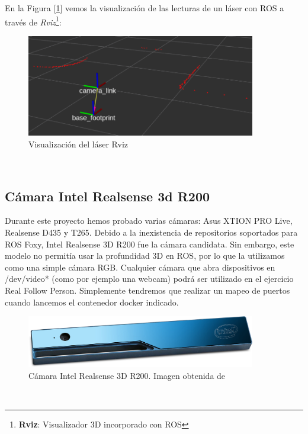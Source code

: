 En la Figura [\ref{fig:laser_rviz}] vemos la visualización de las lecturas de un láser con ROS a través de \textit{Rviz}\footnote{\textbf{Rviz}: Visualizador 3D incorporado con ROS}:\\

\begin{figure} [H]
  \begin{center}
    \includegraphics[width=10cm]{imagenes/cap3/laser-rviz.png}
  \end{center}
  \caption[Visualización del láser en Rviz]{Visualización del láser Rviz}
  \label{fig:laser_rviz}
\end{figure}\


\subsection{Cámara Intel Realsense 3d R200}
\label{subsec:turtlebot2_intel_realsense_3d}

Durante este proyecto hemos probado varias cámaras: Asus XTION PRO Live, Realsense D435 y T265. Debido a la inexistencia de repositorios soportados para ROS Foxy, Intel Realsense 3D R200 fue la cámara candidata. Sin embargo, este modelo no permitía usar la profundidad 3D en ROS, por lo que la utilizamos como una simple cámara RGB. Cualquier cámara que abra dispositivos en /dev/video* (como por ejemplo una webcam) podrá ser utilizado en el ejercicio Real Follow Person. Simplemente tendremos que realizar un mapeo de puertos cuando lancemos el contenedor docker indicado.\\

\begin{figure} [H]
  \begin{center}
    \includegraphics[width=10cm]{imagenes/cap3/r200.jpg}
  \end{center}
  \caption[Cámara Intel Realsense 3D R200]{Cámara Intel Realsense 3D R200. Imagen obtenida de \cite{R200}}
  \label{fig:camara_r200}
\end{figure}\

